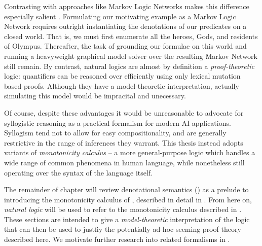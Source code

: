 Contrasting with approaches like Markov Logic Networks makes this difference especially salient
  \cite{key:2006richardson-mln}.
Formulating our motivating example as a Markov Logic Network requires outright instantiating
  the denotations of our predicates on a closed world.
That is, we must first enumerate all the heroes, Gods, and residents of Olympus.
Thereafter, the task of grounding our formulae on this world and running a heavyweight
  graphical model solver over the resulting Markov Network still remain.
By contrast, natural logics are almost by definition a \textit{proof-theoretic} logic:
  quantifiers can be reasoned over efficiently using only lexical mutation based proofs.
Although they have a model-theoretic interpretation, actually simulating this model
  would be impracital and unecessary.


Of course, despite these advantages it would be unreasonable to advocate for syllogistic
  reasoning as a practical formalism for modern AI applications.
Syllogism tend not to allow for easy compositionality, and are generally restrictive in
  the range of inferences they warrant.
This thesis instead adopts variants of \textit{monotonicity calculus}
  \cite{key:1986benthem-natlog,key:1991valencia-natlog}
  -- a more general-purpose logic which handles a wide range of common phenomena in human
  language, while nonetheless still operating over the syntax of the language itself.


%
%
The remainder of chapter will review denotational semantics ()
  as a prelude to introducing the monotonicity calculus of ,
  described in detail in .
From here on, \textit{natural logic} will be used to refer to the monotonicity calculus
  described in .
These sections are intended to give a \textit{model-theoretic} interpretation of the logic
  that can then be used to justfiy the potentially ad-hoc seeming proof theory described
  here.
We motivate further research into related formalisms in .
